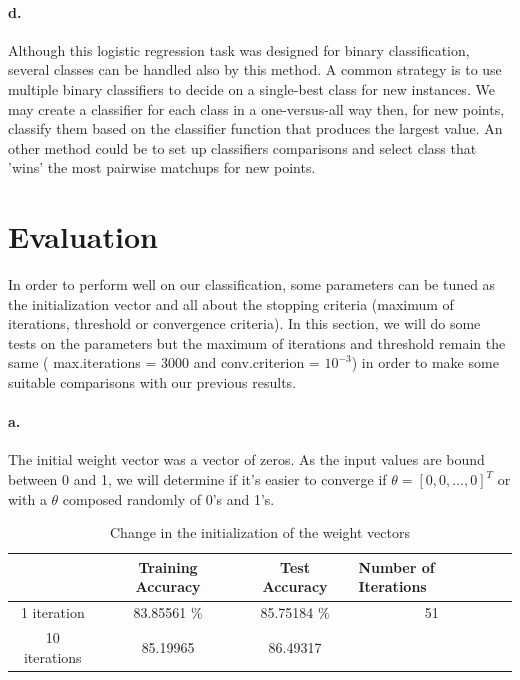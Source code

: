 \documentclass[a4paper,11pt]{article}
\begin{document}
\paragraph*{d.}

Although this logistic regression task was designed for binary classification, several classes can be handled also by this method. A common strategy is to use multiple binary classifiers to decide on a single-best class for new instances. We may create a classifier for each class in a one-versus-all way then, for new points, classify them based on the classifier function that produces the largest value. An other method could be to set up classifiers comparisons and select class that 'wins' the most pairwise matchups for new points. 

\section{Evaluation}

In order to perform well on our classification, some parameters can be tuned as the initialization vector and all about the stopping criteria (maximum of iterations, threshold or convergence criteria). In this section, we will do some tests on the parameters but the maximum of iterations and threshold remain the same ( max.iterations = 3000 and conv.criterion = $10^{-3}$) in order to make some suitable comparisons with our previous results.

\paragraph*{a.} 

The initial weight vector was a vector of zeros. As the input values are bound between 0 and 1, we will determine if it's easier to converge if $\theta = [0, 0, ..., 0]^{T}$ or with a $\theta$ composed randomly of 0's and 1's.

\begin{table}[H]
\centering
\caption{Change in the initialization of the weight vectors}
\label{change_init}
\begin{tabular}{c|c|c|l}
\cline{2-4}
 & Training Accuracy & Test Accuracy & \multicolumn{1}{l|}{Number of Iterations} \\ \hline
\multicolumn{1}{|c|}{1 iteration} & 83.85561 \% & 85.75184 \% & \multicolumn{1}{c|}{51} \\ \hline
\multicolumn{1}{|c|}{10 iterations} & 85.19965 & 86.49317 &  \\ \cline{1-3}
\end{tabular}
\end{table}
\end{document}

